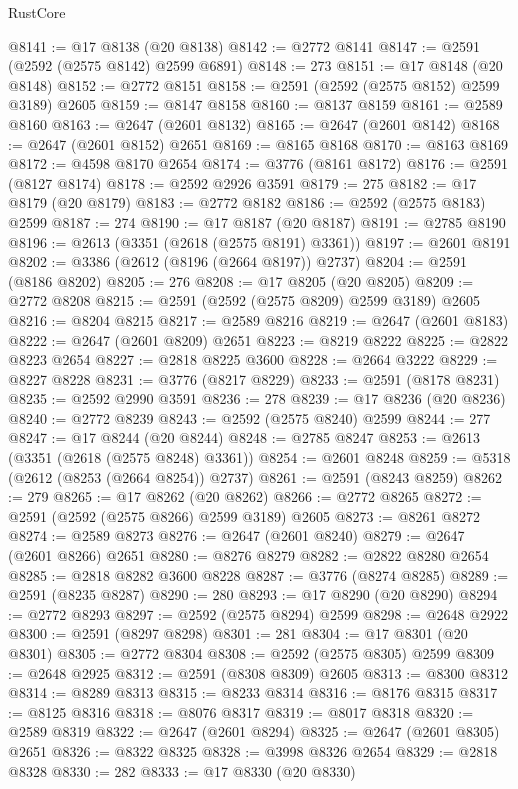 \begin{lexlean}{RustCore}
\begin{coremodule}
@8141 := @17 @8138 (@20 @8138)
@8142 := @2772 @8141
@8147 := @2591 (@2592 (@2575 @8142) @2599 @6891)
@8148 := 273
@8151 := @17 @8148 (@20 @8148)
@8152 := @2772 @8151
@8158 := @2591 (@2592 (@2575 @8152) @2599 @3189) @2605
@8159 := @8147 @8158
@8160 := @8137 @8159
@8161 := @2589 @8160
@8163 := @2647 (@2601 @8132)
@8165 := @2647 (@2601 @8142)
@8168 := @2647 (@2601 @8152) @2651
@8169 := @8165 @8168
@8170 := @8163 @8169
@8172 := @4598 @8170 @2654
@8174 := @3776 (@8161 @8172)
@8176 := @2591 (@8127 @8174)
@8178 := @2592 @2926 @3591
@8179 := 275
@8182 := @17 @8179 (@20 @8179)
@8183 := @2772 @8182
@8186 := @2592 (@2575 @8183) @2599
@8187 := 274
@8190 := @17 @8187 (@20 @8187)
@8191 := @2785 @8190
@8196 := @2613 (@3351 (@2618 (@2575 @8191) @3361))
@8197 := @2601 @8191
@8202 := @3386 (@2612 (@8196 (@2664 @8197)) @2737)
@8204 := @2591 (@8186 @8202)
@8205 := 276
@8208 := @17 @8205 (@20 @8205)
@8209 := @2772 @8208
@8215 := @2591 (@2592 (@2575 @8209) @2599 @3189) @2605
@8216 := @8204 @8215
@8217 := @2589 @8216
@8219 := @2647 (@2601 @8183)
@8222 := @2647 (@2601 @8209) @2651
@8223 := @8219 @8222
@8225 := @2822 @8223 @2654
@8227 := @2818 @8225 @3600
@8228 := @2664 @3222
@8229 := @8227 @8228
@8231 := @3776 (@8217 @8229)
@8233 := @2591 (@8178 @8231)
@8235 := @2592 @2990 @3591
@8236 := 278
@8239 := @17 @8236 (@20 @8236)
@8240 := @2772 @8239
@8243 := @2592 (@2575 @8240) @2599
@8244 := 277
@8247 := @17 @8244 (@20 @8244)
@8248 := @2785 @8247
@8253 := @2613 (@3351 (@2618 (@2575 @8248) @3361))
@8254 := @2601 @8248
@8259 := @5318 (@2612 (@8253 (@2664 @8254)) @2737)
@8261 := @2591 (@8243 @8259)
@8262 := 279
@8265 := @17 @8262 (@20 @8262)
@8266 := @2772 @8265
@8272 := @2591 (@2592 (@2575 @8266) @2599 @3189) @2605
@8273 := @8261 @8272
@8274 := @2589 @8273
@8276 := @2647 (@2601 @8240)
@8279 := @2647 (@2601 @8266) @2651
@8280 := @8276 @8279
@8282 := @2822 @8280 @2654
@8285 := @2818 @8282 @3600 @8228
@8287 := @3776 (@8274 @8285)
@8289 := @2591 (@8235 @8287)
@8290 := 280
@8293 := @17 @8290 (@20 @8290)
@8294 := @2772 @8293
@8297 := @2592 (@2575 @8294) @2599
@8298 := @2648 @2922
@8300 := @2591 (@8297 @8298)
@8301 := 281
@8304 := @17 @8301 (@20 @8301)
@8305 := @2772 @8304
@8308 := @2592 (@2575 @8305) @2599
@8309 := @2648 @2925
@8312 := @2591 (@8308 @8309) @2605
@8313 := @8300 @8312
@8314 := @8289 @8313
@8315 := @8233 @8314
@8316 := @8176 @8315
@8317 := @8125 @8316
@8318 := @8076 @8317
@8319 := @8017 @8318
@8320 := @2589 @8319
@8322 := @2647 (@2601 @8294)
@8325 := @2647 (@2601 @8305) @2651
@8326 := @8322 @8325
@8328 := @3998 @8326 @2654
@8329 := @2818 @8328
@8330 := 282
@8333 := @17 @8330 (@20 @8330)

\end{coremodule}
\end{lexlean}

